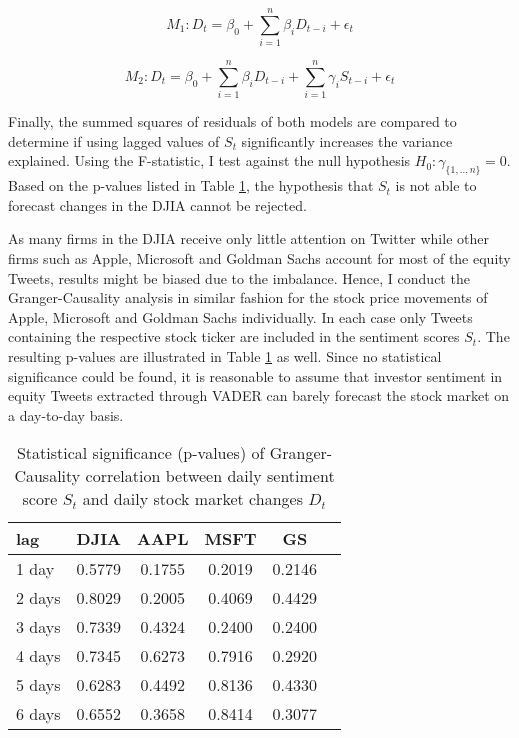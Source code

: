 \documentclass[a4paper,12pt]{article}%
\begin{document}
\begin{equation}
M_1: D_t = \beta_0 + \sum_{i=1}^n \beta_i D_{t-i} + \epsilon_t
\end{equation}

\begin{equation}
M_2: D_t = \beta_0 + \sum_{i=1}^n \beta_i D_{t-i} + \sum_{i=1}^n \gamma_i S_{t-i} + \epsilon_t
\end{equation}

Finally, the summed squares of residuals of both models are compared to determine if using lagged values of $S_t$ significantly increases the variance explained. Using the F-statistic, I test against the null hypothesis $H_0: \gamma_{\{1,..,n\}} = 0$. Based on the p-values listed in Table \ref{table:granger}, the hypothesis that $S_t$ is not able to forecast changes in the DJIA cannot be rejected. 

As many firms in the DJIA receive only little attention on Twitter while other firms such as Apple, Microsoft and Goldman Sachs account for most of the equity Tweets, results might be biased due to the imbalance. Hence, I conduct the Granger-Causality analysis in similar fashion for the stock price movements of Apple, Microsoft and Goldman Sachs individually. In each case only Tweets containing the respective stock ticker are included in the sentiment scores $S_t$. The resulting p-values are illustrated in Table \ref{table:granger} as well.
Since no statistical significance could be found, it is reasonable to assume that investor sentiment in equity Tweets extracted through VADER can barely forecast the stock market on a day-to-day basis. 

\begin{table}
\centering
\captionsetup{justification=centering}
\begin{tabular}{l|c c c c c}
\hline
lag & DJIA & AAPL & MSFT & GS \\ \hline
1 day  & 0.5779  & 0.1755 & 0.2019 & 0.2146 \\ 
2 days  & 0.8029 & 0.2005 & 0.4069  & 0.4429 \\ 
3 days  & 0.7339 & 0.4324 & 0.2400 & 0.2400 \\ 
4 days  & 0.7345 & 0.6273 & 0.7916 & 0.2920 \\ 
5 days  & 0.6283 & 0.4492 & 0.8136 & 0.4330 \\ 
6 days  & 0.6552 & 0.3658 & 0.8414 & 0.3077 \\ \hline

\end{tabular}
\caption[Statistical Significance of Granger-Correlation Bewteen Aggregated VADER Sentiment Scores and Daily DJIA Changes]{Statistical significance (p-values) of Granger-Causality correlation between daily sentiment score $S_t$ and daily stock market changes $D_t$ \label{table:granger}}
\end{table}
\end{document}
